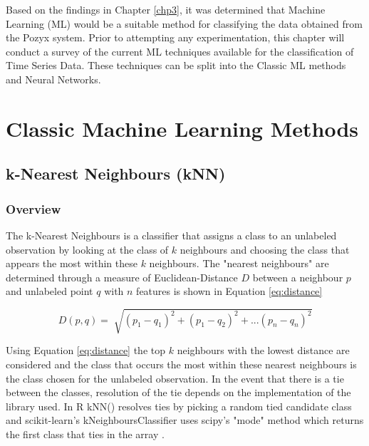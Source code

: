 Based on the findings in Chapter \ref{chp3}, it was determined that Machine Learning (ML) would be a suitable method for classifying the data obtained from the Pozyx system. Prior to attempting any experimentation, this chapter will conduct a survey of the current ML techniques available for the classification of Time Series Data. These techniques can be split into the Classic ML methods and Neural Networks. 


\section{Classic Machine Learning Methods}
\subsection{k-Nearest Neighbours (kNN)} \label{sec:knn}
\subsubsection{Overview}
The k-Nearest Neighbours is a classifier that assigns a class to an unlabeled observation by looking at the class of $k$ neighbours and choosing the class that appears the most within these $k$ neighbours. The "nearest neighbours" are determined through a measure of Euclidean-Distance $D$ between a neighbour $p$ and unlabeled point $q$ with $n$ features is shown in Equation \ref{eq:distance} \cite{zhangIntroductionMachineLearning2016}

\begin{equation}
    D(p, q) = \sqrt[]{(p_1 - q_1)^2 + (p_1 - q_2)^2 + ... (p_n - q_n)^2}
    \label{eq:distance}
\end{equation}

Using Equation \ref{eq:distance} the top $k$ neighbours with the lowest distance are considered and the class that occurs the most within these nearest neighbours is the class chosen for the unlabeled observation. In the event that there is a tie between the classes, resolution of the tie depends on the implementation of the library used. In R kNN() resolves ties by picking a random tied candidate class \cite{zhangIntroductionMachineLearning2016} and scikit-learn's kNeighboursClassifier uses scipy's "mode" method which returns the first class that ties in the array \cite{ScipyStatsMode}.


